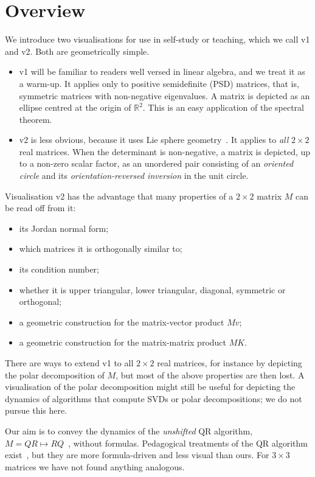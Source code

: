 \documentclass[12pt, a4paper]{report}
\newenvironment{itemizedot}{\begin{itemize} \renewcommand{\labelitemi}{$\bullet$}\renewcommand{\labelitemii}{$\bullet$}\renewcommand{\labelitemiii}{$\bullet$}\renewcommand{\labelitemiv}{$\bullet$}}{\end{itemize}}
\theoremstyle{plain}
\theoremstyle{definition}
\theoremstyle{remark}
\theoremstyle{plain}
\newcommand{\RR}{\mathbb{R}}
\begin{document}
\section{Overview}
We introduce two visualisations for use in self-study or teaching, which we call v1 and v2. Both are geometrically simple.
\begin{itemizedot}
  \item v1 will be familiar to readers well versed in linear algebra, and we treat it as a warm-up. It applies only to positive semidefinite (PSD) matrices, that is, symmetric matrices with non-negative eigenvalues. A matrix is depicted as an ellipse centred at the origin of $\RR^2$. This is an easy application of the spectral theorem.
  \item v2 is less obvious, because it uses Lie sphere geometry~\cite{cecil1992lie}. It applies to \emph{all} $2 \times 2$ real matrices. When the determinant is non-negative, a matrix is depicted, up to a non-zero scalar factor, as an unordered pair consisting of an \emph{oriented circle} and its \emph{orientation-reversed inversion} in the unit circle.
\end{itemizedot}
Visualisation v2 has the advantage that many properties of a $2 \times 2$ matrix $M$ can be read off from it:
\begin{itemizedot}
  \item its Jordan normal form;
  \item which matrices it is orthogonally similar to;
  \item its condition number;
  \item whether it is upper triangular, lower triangular, diagonal, symmetric or orthogonal;
  \item a geometric construction for the matrix-vector product $Mv$;
  \item a geometric construction for the matrix-matrix product $MK$.
\end{itemizedot}
There are ways to extend v1 to all $2 \times 2$ real matrices, for instance by depicting the polar decomposition of $M$, but most of the above properties are then lost. A visualisation of the polar decomposition might still be useful for depicting the dynamics of algorithms that compute SVDs or polar decompositions; we do not pursue this here.

Our aim is to convey the dynamics of the \emph{unshifted} QR algorithm, $M=QR\mapsto RQ$~\cite{Francis1961,Francis1962}, without formulas. Pedagogical treatments of the QR algorithm exist~\cite{watkins2008qr,buurema1958geometric}, but they are more formula-driven and less visual than ours. For $3 \times 3$ matrices we have not found anything analogous.
\end{document}
